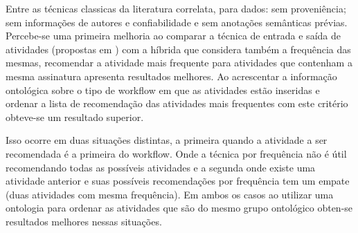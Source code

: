 \documentclass{acm_proc_article-sp}
\begin{document}
Entre as t{\'e}cnicas classicas da literatura correlata, para dados: sem proveni{\^e}ncia; sem informa\c{c}{\~o}es de autores e confiabilidade e sem anota\c{c}{\~o}es sem{\^a}nticas pr{\'e}vias. Percebe-se uma primeira melhoria ao comparar a t{\'e}cnica de entrada e sa{\'i}da de atividades (propostas em \cite{TELEA13, VINCA4Science07, Grafo12, diamantini_mining_2012, Zhang2011, Zhang2014}) com a h{\'i}brida que considera tamb{\'e}m a frequ{\^e}ncia das mesmas, recomendar a atividade mais frequente para atividades que contenham a mesma assinatura apresenta resultados melhores. Ao acrescentar a informa\c{c}{\~a}o ontol{\'o}gica sobre o tipo de workflow em que as atividades est{\~a}o inseridas e ordenar a lista de recomenda\c{c}{\~a}o das atividades mais frequentes com este crit{\'e}rio obteve-se um resultado superior.

Isso ocorre em duas situa\c{c}{\~o}es distintas, a primeira quando a atividade a ser recomendada {\'e} a primeira do workflow. Onde a t{\'e}cnica por frequ{\^e}ncia n{\~a}o {\'e} {\'u}til recomendando todas as poss{\'i}veis atividades e a segunda onde existe uma atividade anterior e suas poss{\'i}veis recomenda\c{c}{\~o}es por frequ{\^e}ncia tem um empate (duas atividades com mesma frequ{\^e}ncia). Em ambos os casos ao utilizar uma ontologia para ordenar as atividades que s{\~a}o do mesmo grupo ontol{\'o}gico obten-se resultados melhores nessas situa\c{c}{\~o}es.
\end{document}
